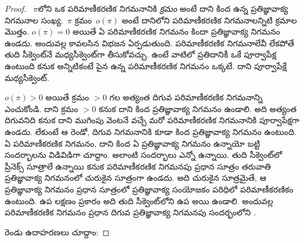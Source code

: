 \documentclass[../../../include/open-logic-section]{subfiles}
\begin{document}
\begin{proof}
  ~$\pi$లోని ఒక పరిమాణీకరణిక నిగమనానికి \emph{క్రమం} అంటే దాని కింద ఉన్న ప్రతిజ్ఞావాక్య నిగమనాల సంఖ్య.~$\pi$ క్రమం~$o(\pi)$ అంటే దానిలోని పరిమాణీకరణిక నిగమనాలన్నిటి క్రమాల మొత్తం. $o(\pi) = 0$ అయితే ఏ పరిమాణీకరణిక నిగమనం కిందా ప్రతిజ్ఞావాక్య నిగమనం ఉండదు. అందువల్ల కావలసిన విభజన ఏర్పడుతుంది. పరిమాణీకరణిక నిగమనాలేవీ లేకపోతే తుది సీక్వెంట్‌నే మధ్యసీక్వెంట్‌గా తీసుకోవచ్చు. ఉంటే వాటిలో ప్రతిదానికీ ఒకే పూర్వాపేక్ష ఉంటుంది కనుక అన్నిటికంటే పైన ఉన్న పరిమాణీకరణిక నిగమనం ఒక్కటే. దాని పూర్వాపేక్షే మధ్యసీక్వెంట్.

  $o(\pi) > 0$ అయితే క్రమం $>0$ గల అత్యంత దిగువ పరిమాణీకరణిక నిగమనాన్ని ఎంచుకోండి. దాని క్రమం $>0$ కనుక దాని కింద ప్రతిజ్ఞావాక్య నిగమనం ఉండాలి. అది అత్యంత దిగువనిది కనుక దాని ముగింపు వెంటనే వచ్చే మరో పరిమాణీకరణిక నిగమనానికి పూర్వాపేక్షగా ఉండదు. లేకుంటే ఆ రెండో, దిగువ నిగమనానికి కూడా కింద ప్రతిజ్ఞావాక్య నిగమనం ఉంటుంది. ఏ పరిమాణీకరణిక నిగమనం, దాని కింద ఏ ప్రతిజ్ఞావాక్య నిగమనం ఉన్నాయో బట్టి సందర్భాలను విడివిడిగా చూద్దాం. అలాంటి సందర్భాలు ఎన్నో ఉన్నాయి. తుది సీక్వెంట్‌లో ప్రీనెక్స్ సూత్రాలే ఉన్నాయి కనుక పరిమాణీకరణిక నిగమనపు ప్రధాన సూత్రం తరువాతి ప్రతిజ్ఞావాక్య నిగమనంలో చురుకైన సూత్రంగా ఉండదు. అది చురుకైన సూత్రమైతే, ఆ ప్రతిజ్ఞావాక్య నిగమనం ప్రధాన సూత్రంలో ప్రతిజ్ఞావాక్య సంయోజకం పరిధిలో పరిమాణీకరణికం ఉంటుంది. ఉప లక్షణం ప్రకారం అది తుది సీక్వెంట్‌లోని  ఉప అయి ఉండాలి. అందువల్ల పరిమాణీకరణిక నిగమనం ప్రధాన  దిగువ ప్రతిజ్ఞావాక్య నిగమనపు సందర్భంలోని .

  రెండు ఉదాహరణలు చూద్దాం:


\end{proof}
\end{document}
